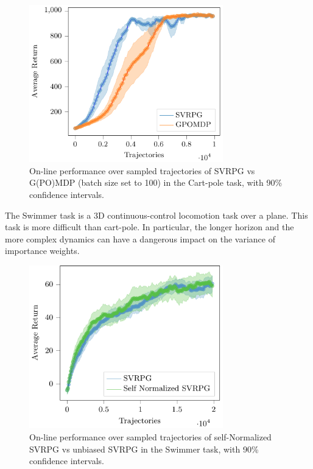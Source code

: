 \begin{figure}[h]
	\begin{minipage}[h]{1\textwidth}
		\centering
		\includegraphics[width=0.75\textwidth]{Images/Experiments/cart_pole_GPOMDP_100_vs_SVRPG.pdf}
		\vspace{-0.1in}
		\caption{On-line performance over sampled trajectories of \acs{SVRPG} vs G(PO)MDP (batch size set to 100) in the Cart-pole task, with 90\% confidence intervals.}
		\label{fig:cartpole100}
	\end{minipage}
	\vspace{-0.15in}
\end{figure}
\newpage
The Swimmer task is a 3D continuous-control locomotion task over a plane. This task is more difficult than cart-pole. In particular, the longer horizon and the more complex dynamics can have a dangerous impact on the variance of importance weights.

\begin{figure}[h]
	\begin{minipage}[h]{1\textwidth}
		\centering
		\includegraphics[width=0.75\textwidth]{Images/Experiments/swimmer_self_normalized_SVRPG_vs_SVRPG_tex.pdf}
		\vspace{-0.1in}
		\caption{On-line performance over sampled trajectories of self-Normalized \acs{SVRPG} vs unbiased \acs{SVRPG} in the Swimmer task, with 90\% confidence intervals.}
		\label{fig:swimmertwo}
	\end{minipage}
	\vspace{-0.15in}
\end{figure}

